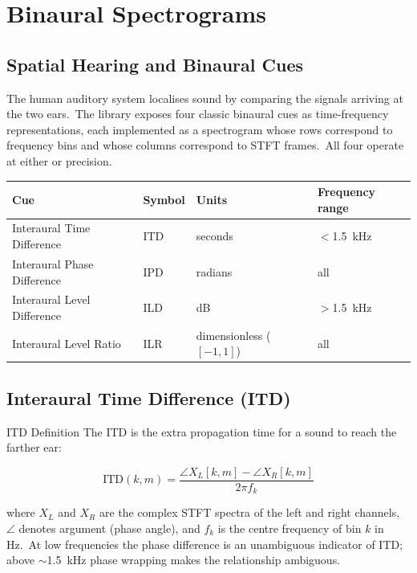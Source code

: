 \section{Binaural Spectrograms}\label{sec:binaural}

\subsection{Spatial Hearing and Binaural Cues}\label{subsec:binaural_intro}

The human auditory system localises sound by comparing the signals
arriving at the two ears.\ The library exposes four classic binaural
cues as time-frequency representations, each implemented as a
spectrogram whose rows correspond to frequency bins and whose columns
correspond to STFT frames.\ All four operate at either  or
 precision.

\begin{center}
  \begin{tabular}{llll}
    \textbf{Cue} & \textbf{Symbol} & \textbf{Units} &
    \textbf{Frequency range} \\
    \hline
    Interaural Time Difference & ITD & seconds & $<$1.5~kHz \\
    Interaural Phase Difference & IPD & radians & all \\
    Interaural Level Difference & ILD & dB & $>$1.5~kHz \\
    Interaural Level Ratio & ILR & dimensionless ($[-1,1]$) & all \\
  \end{tabular}
\end{center}

\subsection{Interaural Time Difference (ITD)}\label{subsec:itd}

\begin{concept}{ITD Definition}
  The ITD is the extra propagation time for a sound to reach the
  farther ear:

  \begin{equation}
    \label{eq:itd}
    \text{ITD}(k, m) = \frac{\angle X_L[k,m] - \angle X_R[k,m]}{2\pi f_k}
  \end{equation}

  where $X_L$ and $X_R$ are the complex STFT spectra of the left and
  right channels, $\angle$ denotes argument (phase angle), and $f_k$
  is the centre frequency of bin $k$ in Hz.\ At low frequencies the
  phase difference is an unambiguous indicator of ITD; above $\sim$1.5~kHz
  phase wrapping makes the relationship ambiguous.
\end{concept}

